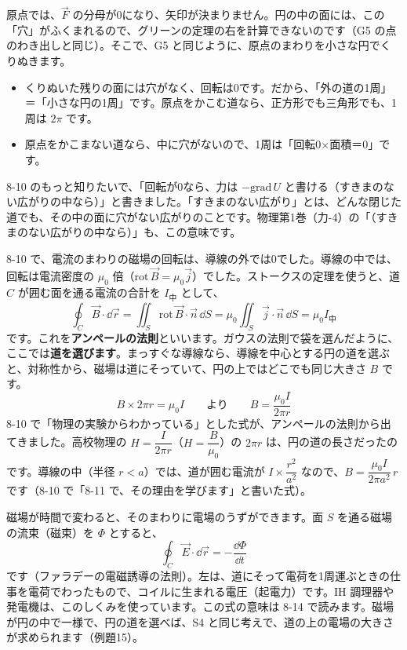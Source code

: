 \noindent 原点では、$\vec F$ の分母が0になり、矢印が決まりません。円の中の面には、この「穴」がふくまれるので、グリーンの定理の右を計算できないのです（G5 の点のわき出しと同じ）。そこで、G5 と同じように、原点のまわりを小さな円でくりぬきます。
\begin{itemize}[leftmargin=1.2\zw, itemsep=2pt, topsep=2pt, label={\color{\bkTT}●}]
\item くりぬいた残りの面には穴がなく、回転は0です。だから、「外の道の1周」＝「小さな円の1周」です。原点をかこむ道なら、正方形でも三角形でも、1周は $2\pi$ です。
\item 原点をかこまない道なら、中に穴がないので、1周は「回転0×面積＝0」です。
\end{itemize}
8-10 のもっと知りたいで、「回転が0なら、力は $-\mathrm{grad}\,U$ と書ける（すきまのない広がりの中なら）」と書きました。「すきまのない広がり」とは、どんな閉じた道でも、その中の面に穴がない広がりのことです。物理第1巻（力-4）の「（すきまのない広がりの中なら）」も、この意味です。


\leavevmode\label{bk:8-11:ampere}8-10 で、電流のまわりの磁場の回転は、導線の外では0でした。導線の中では、回転は電流密度の $\mu_0$ 倍（$\mathrm{rot}\,\vec B=\mu_0\vec j$）でした。ストークスの定理を使うと、道 $C$ が囲む面を通る電流の合計を $I_{\text{中}}$ として、
\[ \oint_C\vec B\cdot\dd\vec r=\iint_S\mathrm{rot}\,\vec B\cdot\vec n\,\dd S=\mu_0\iint_S\vec j\cdot\vec n\,\dd S=\mu_0I_{\text{中}} \]
です。これを\textbf{アンペールの法則}といいます。ガウスの法則で袋を選んだように、ここでは\textbf{道を選びます}。まっすぐな導線なら、導線を中心とする円の道を選ぶと、対称性から、磁場は道にそっていて、円の上ではどこでも同じ大きさ $B$ です。
\[ B\times2\pi r=\mu_0I\qquad\text{より}\qquad B=\frac{\mu_0I}{2\pi r} \]
8-10 で「物理の実験からわかっている」とした式が、アンペールの法則から出てきました。高校物理の $H=\dfrac{I}{2\pi r}$（$H=\dfrac{B}{\mu_0}$）の $2\pi r$ は、円の道の長さだったのです。導線の中（半径 $r<a$）では、道が囲む電流が $I\times\dfrac{r^2}{a^2}$ なので、$B=\dfrac{\mu_0I}{2\pi a^2}\,r$ です（8-10 で「8-11 で、その理由を学びます」と書いた式）。

磁場が時間で変わると、そのまわりに電場のうずができます。面 $S$ を通る磁場の流束（磁束）を $\Phi$ とすると、
\[ \oint_C\vec E\cdot\dd\vec r=-\frac{\dd\Phi}{\dd t} \]
です（ファラデーの電磁誘導の法則）。左は、道にそって電荷を1周運ぶときの仕事を電荷でわったもので、コイルに生まれる電圧（起電力）です。IH 調理器や発電機は、このしくみを使っています。この式の意味は 8-14 で読みます。磁場が円の中で一様で、円の道を選べば、S4 と同じ考えで、道の上の電場の大きさが求められます（例題15）。

